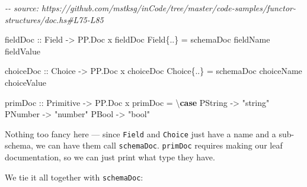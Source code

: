 \documentclass[]{article}
\newenvironment{Shaded}{}{}
\newcommand{\CommentTok}[1]{\textcolor[rgb]{0.38,0.63,0.69}{\textit{#1}}}
\newcommand{\DataTypeTok}[1]{\textcolor[rgb]{0.56,0.13,0.00}{#1}}
\newcommand{\KeywordTok}[1]{\textcolor[rgb]{0.00,0.44,0.13}{\textbf{#1}}}
\newcommand{\NormalTok}[1]{#1}
\newcommand{\OperatorTok}[1]{\textcolor[rgb]{0.40,0.40,0.40}{#1}}
\newcommand{\OtherTok}[1]{\textcolor[rgb]{0.00,0.44,0.13}{#1}}
\newcommand{\StringTok}[1]{\textcolor[rgb]{0.25,0.44,0.63}{#1}}
\begin{document}
\begin{Shaded}
\begin{Highlighting}[]
\CommentTok{{-}{-} source: https://github.com/mstksg/inCode/tree/master/code{-}samples/functor{-}structures/doc.hs\#L75{-}L85}

\OtherTok{fieldDoc ::} \DataTypeTok{Field} \OtherTok{{-}>} \DataTypeTok{PP.Doc}\NormalTok{ x}
\NormalTok{fieldDoc }\DataTypeTok{Field}\NormalTok{\{}\OperatorTok{..}\NormalTok{\} }\OtherTok{=}\NormalTok{ schemaDoc fieldName fieldValue}

\OtherTok{choiceDoc ::} \DataTypeTok{Choice} \OtherTok{{-}>} \DataTypeTok{PP.Doc}\NormalTok{ x}
\NormalTok{choiceDoc }\DataTypeTok{Choice}\NormalTok{\{}\OperatorTok{..}\NormalTok{\} }\OtherTok{=}\NormalTok{ schemaDoc choiceName choiceValue}

\OtherTok{primDoc ::} \DataTypeTok{Primitive} \OtherTok{{-}>} \DataTypeTok{PP.Doc}\NormalTok{ x}
\NormalTok{primDoc }\OtherTok{=}\NormalTok{ \textbackslash{}}\KeywordTok{case}
  \DataTypeTok{PString} \OtherTok{{-}>} \StringTok{"string"}
  \DataTypeTok{PNumber} \OtherTok{{-}>} \StringTok{"number"}
  \DataTypeTok{PBool}   \OtherTok{{-}>} \StringTok{"bool"}
\end{Highlighting}
\end{Shaded}

Nothing too fancy here --- since \texttt{Field} and \texttt{Choice} just have a
name and a sub-schema, we can have them call \texttt{schemaDoc}.
\texttt{primDoc} requires making our leaf documentation, so we can just print
what type they have.

We tie it all together with \texttt{schemaDoc}:
\end{document}

